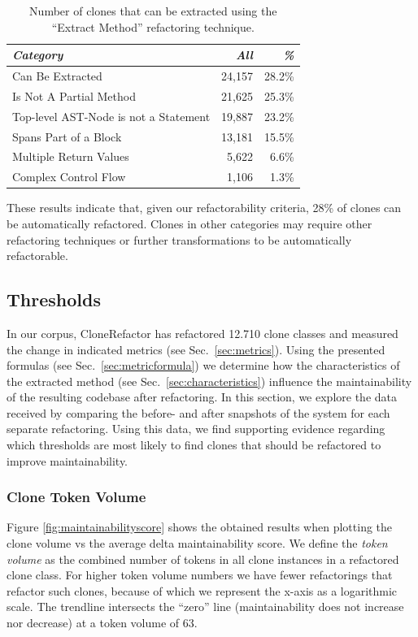 \documentclass[conference]{IEEEtran}
\begin{document}
\begin{table}[H]
\centering
\begin{tabular}{@{}lrr@{}}
\toprule
\textit{\textbf{Category}} & \textit{\textbf{All}} & \textit{\textbf{\%}} \\ \midrule
Can Be Extracted & 24,157 & 28.2\%  \\
Is Not A Partial Method & 21,625 & 25.3\% \\
Top-level AST-Node is not a Statement & 19,887 & 23.2\% \\
Spans Part of a Block & 13,181 & 15.5\%  \\
Multiple Return Values & 5,622 & 6.6\%  \\
Complex Control Flow & 1,106 & 1.3\% \\
\end{tabular}
\caption{Number of clones that can be extracted using the ``Extract Method'' refactoring technique.}
\label{tab:refactorability}
\end{table}

These results indicate that, given our refactorability criteria, 28\% of clones can be automatically refactored. Clones in other categories may require other refactoring techniques or further transformations to be automatically refactorable.

\subsection{Thresholds}
In our corpus, CloneRefactor has refactored 12.710 clone classes and measured the change in indicated metrics (see Sec.~\ref{sec:metrics}). Using the presented formulas (see Sec.~\ref{sec:metricformula}) we determine how the characteristics of the extracted method (see Sec.~\ref{sec:characteristics}) influence the maintainability of the resulting codebase after refactoring. In this section, we explore the data received by comparing the before- and after snapshots of the system for each separate refactoring. Using this data, we find supporting evidence regarding which thresholds are most likely to find clones that should be refactored to improve maintainability.

\subsubsection{Clone Token Volume}
Figure \ref{fig:maintainabilityscore} shows the obtained results when plotting the clone volume vs the average delta maintainability score. We define the \textit{token volume} as the combined number of tokens in all clone instances in a refactored clone class. For higher token volume numbers we have fewer refactorings that refactor such clones, because of which we represent the x-axis as a logarithmic scale. The trendline intersects the ``zero'' line (maintainability does not increase nor decrease) at a token volume of 63.
\end{document}
